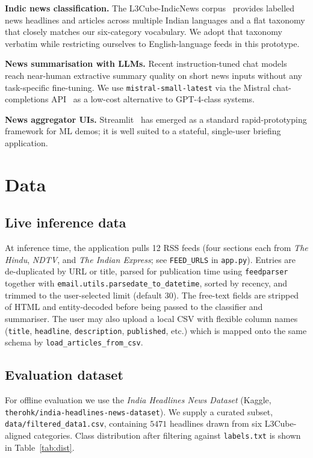 \documentclass[10pt,twocolumn,letterpaper]{article}
\begin{document}
\noindent\textbf{Indic news classification.} The L3Cube-IndicNews corpus~\cite{l3cube} provides labelled news headlines and articles across multiple Indian languages and a flat taxonomy that closely matches our six-category vocabulary. We adopt that taxonomy verbatim while restricting ourselves to English-language feeds in this prototype.

\noindent\textbf{News summarisation with LLMs.} Recent instruction-tuned chat models reach near-human extractive summary quality on short news inputs without any task-specific fine-tuning. We use \texttt{mistral-small-latest} via the Mistral chat-completions API~\cite{mistral} as a low-cost alternative to GPT-4-class systems.

\noindent\textbf{News aggregator UIs.} Streamlit~\cite{streamlit} has emerged as a standard rapid-prototyping framework for ML demos; it is well suited to a stateful, single-user briefing application.

\section{Data}
\label{sec:data}

\subsection{Live inference data}
At inference time, the application pulls 12 RSS feeds (four sections each from \textit{The Hindu}, \textit{NDTV}, and \textit{The Indian Express}; see \texttt{FEED\_URLS} in \texttt{app.py}). Entries are de-duplicated by URL or title, parsed for publication time using \texttt{feedparser} together with \texttt{email.utils.parsedate\_to\_datetime}, sorted by recency, and trimmed to the user-selected limit (default $30$). The free-text fields are stripped of HTML and entity-decoded before being passed to the classifier and summariser. The user may also upload a local CSV with flexible column names (\texttt{title}, \texttt{headline}, \texttt{description}, \texttt{published}, etc.) which is mapped onto the same schema by \texttt{load\_articles\_from\_csv}.

\subsection{Evaluation dataset}
For offline evaluation we use the \textit{India Headlines News Dataset} (Kaggle, \texttt{therohk/india-headlines-news-dataset}). We supply a curated subset, \texttt{data/filtered\_data1.csv}, containing $5471$ headlines drawn from six L3Cube-aligned categories. Class distribution after filtering against \texttt{labels.txt} is shown in Table~\ref{tab:dist}.
\end{document}
